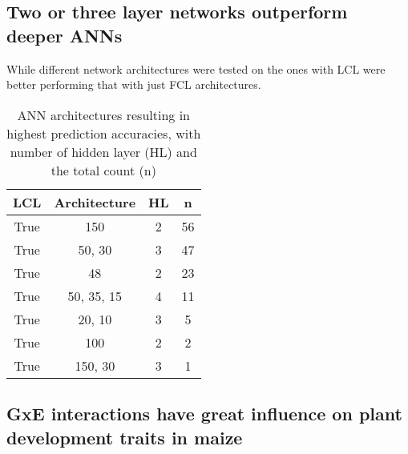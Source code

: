 \subsection{Two or three layer networks outperform deeper ANNs}

While different network architectures were tested on the ones with LCL were better
performing that with just FCL architectures.



\onehalfspacing
\begin{table}[H]
 \centering
 \caption[ANN architectures of ANN resulting in highest prediction accuracies]{ANN
   architectures resulting in highest prediction accuracies, with number of hidden layer
   (HL) and the total count (n)}
 \begin{tabular}{cccc}
   \toprule
   LCL  & Architecture & HL & n  \\ 
   \midrule
   True & 150          & 2  & 56 \\ 
   True & 50, 30       & 3  & 47 \\ 
   True & 48           & 2  & 23 \\ 
   True & 50, 35, 15   & 4  & 11 \\ 
   True & 20, 10       & 3  & 5  \\ 
   True & 100          & 2  & 2  \\ 
   True & 150, 30      & 3  & 1  \\
   \bottomrule
\end{tabular}
\end{table}
\doublespacing

\subsection{GxE interactions have great influence on plant development traits in maize}

